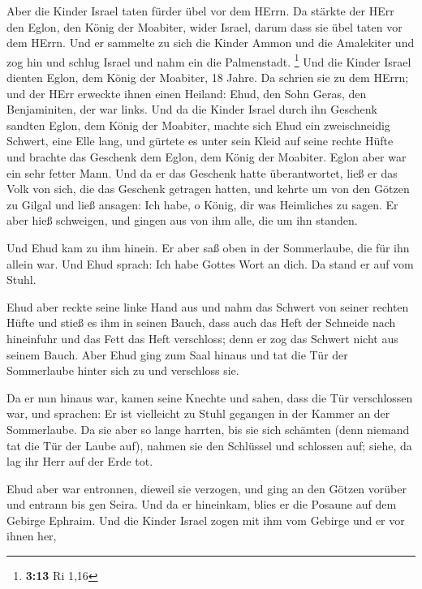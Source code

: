  Aber die Kinder Israel taten fürder übel vor dem HErrn. Da
stärkte der HErr den Eglon, den König der Moabiter, wider Israel, darum
dass sie übel taten vor dem HErrn.  Und er sammelte zu sich
die Kinder Ammon und die Amalekiter und zog hin und schlug Israel und
nahm ein die Palmenstadt. \footnote{\textbf{3:13} Ri 1,16} 
Und die Kinder Israel dienten Eglon, dem König der Moabiter, 18 Jahre.
 Da schrien sie zu dem HErrn; und der HErr erweckte ihnen
einen Heiland: Ehud, den Sohn Geras, den Benjaminiten, der war links.
Und da die Kinder Israel durch ihn Geschenk sandten Eglon, dem König der
Moabiter,  machte sich Ehud ein zweischneidig Schwert, eine
Elle lang, und gürtete es unter sein Kleid auf seine rechte Hüfte
 und brachte das Geschenk dem Eglon, dem König der
Moabiter. Eglon aber war ein sehr fetter Mann.  Und da er
das Geschenk hatte überantwortet, ließ er das Volk von sich, die das
Geschenk getragen hatten,  und kehrte um von den Götzen zu
Gilgal und ließ ansagen: Ich habe, o König, dir was Heimliches zu sagen.
Er aber hieß schweigen, und gingen aus von ihm alle, die um ihn standen.

 Und Ehud kam zu ihm hinein. Er aber saß oben in der
Sommerlaube, die für ihn allein war. Und Ehud sprach: Ich habe Gottes
Wort an dich. Da stand er auf vom Stuhl.

 Ehud aber reckte seine linke Hand aus und nahm das Schwert
von seiner rechten Hüfte und stieß es ihm in seinen Bauch, 
dass auch das Heft der Schneide nach hineinfuhr und das Fett das Heft
verschloss; denn er zog das Schwert nicht aus seinem Bauch.
 Aber Ehud ging zum Saal hinaus und tat die Tür der
Sommerlaube hinter sich zu und verschloss sie.

 Da er nun hinaus war, kamen seine Knechte und sahen, dass
die Tür verschlossen war, und sprachen: Er ist vielleicht zu Stuhl
gegangen in der Kammer an der Sommerlaube.  Da sie aber so
lange harrten, bis sie sich schämten (denn niemand tat die Tür der Laube
auf), nahmen sie den Schlüssel und schlossen auf; siehe, da lag ihr Herr
auf der Erde tot.

 Ehud aber war entronnen, dieweil sie verzogen, und ging an
den Götzen vorüber und entrann bis gen Seira.  Und da er
hineinkam, blies er die Posaune auf dem Gebirge Ephraim. Und die Kinder
Israel zogen mit ihm vom Gebirge und er vor ihnen her,

